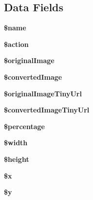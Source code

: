 \subsection*{Data Fields}
\begin{DoxyCompactItemize}
\item 
\hypertarget{class_image_ab2fc40d43824ea3e1ce5d86dee0d763b}{{\bfseries \$name}}\label{class_image_ab2fc40d43824ea3e1ce5d86dee0d763b}

\item 
\hypertarget{class_image_aa698a3e72116e8e778be0e95d908ee30}{{\bfseries \$action}}\label{class_image_aa698a3e72116e8e778be0e95d908ee30}

\item 
\hypertarget{class_image_ad8a744e49375a9be84ea92e850908179}{{\bfseries \$original\+Image}}\label{class_image_ad8a744e49375a9be84ea92e850908179}

\item 
\hypertarget{class_image_a45020fda034c5558a99e4e7a597b3ec9}{{\bfseries \$converted\+Image}}\label{class_image_a45020fda034c5558a99e4e7a597b3ec9}

\item 
\hypertarget{class_image_a7022e6e8bf6a8cdc5c0363032a63612f}{{\bfseries \$original\+Image\+Tiny\+Url}}\label{class_image_a7022e6e8bf6a8cdc5c0363032a63612f}

\item 
\hypertarget{class_image_aa15a0686725f448739516fc5235633f3}{{\bfseries \$converted\+Image\+Tiny\+Url}}\label{class_image_aa15a0686725f448739516fc5235633f3}

\item 
\hypertarget{class_image_ae995ff20f80201bd82d98f6b0e8f9fdb}{{\bfseries \$percentage}}\label{class_image_ae995ff20f80201bd82d98f6b0e8f9fdb}

\item 
\hypertarget{class_image_a5795120b4b324bc4ca83f1e6fdce7d57}{{\bfseries \$width}}\label{class_image_a5795120b4b324bc4ca83f1e6fdce7d57}

\item 
\hypertarget{class_image_a2c265bba1724371bb03e6901297c30b2}{{\bfseries \$height}}\label{class_image_a2c265bba1724371bb03e6901297c30b2}

\item 
\hypertarget{class_image_af3a16c5f0dd7a74cf9acf6a49fff73a7}{{\bfseries \$x}}\label{class_image_af3a16c5f0dd7a74cf9acf6a49fff73a7}

\item 
\hypertarget{class_image_a77b973d137fb33212e018b042df6e3e7}{{\bfseries \$y}}\label{class_image_a77b973d137fb33212e018b042df6e3e7}

\end{DoxyCompactItemize}



